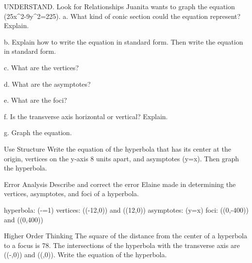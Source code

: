 \documentclass{article}
\newenvironment{practice}[2]{}{}        %
\newcommand{\answer}[1]{}               %
\newcommand{\placeholder}[2]{}          %
\newcommand{\te}[1]{}                   %
\begin{document}
\begin{practice}{13}{2}
UNDERSTAND. Look for Relationships Juanita wants to graph the equation (25x^2-9y^2=225).
a. What kind of conic section could the equation represent? Explain.
\answer{The coefficients (x^2) and (y^2) in the equation have opposite signs, so it could be a hyperbola.}
b. Explain how to write the equation in standard form. Then write the equation in standard form.
\answer{Divide each side of the equation by 225; (\frac{x^2}{9}-\frac{y^2}{25}=1)}
c. What are the vertices?
\answer{((-3,0)) and ((3,0))}
d. What are the asymptotes?
\answer{(y=\pm\frac{5}{3}x)}
e. What are the foci?
\answer{((-\sqrt{34},0)) and ((\sqrt{34},0))}
f. Is the transverse axis horizontal or vertical? Explain.
\answer{The transverse axis is horizontal because the vertices and foci lie along the x-axis.}
g. Graph the equation.
\answer{See graph.}
\placeholder{graph}{Answer 13g: unit grid [-5,5] both axes, black x/y axes with arrows, O origin, labels +/-2,+/-4. Red horizontal hyperbola x^2/9-y^2/25=1 with arrowheads at four ends and vertices (+/-3,0). No asymptotes.}
\end{practice}
\begin{practice}{14}{2}
Use Structure Write the equation of the hyperbola that has its center at the origin, vertices on the y-axis 8 units apart, and asymptotes (y=\pm{}x). Then graph the hyperbola.
\answer{(\frac{y^2}{16}-\frac{x^2}{9}=1)}
\placeholder{graph}{Answer 14: grid [-10,10] both axes with spacing 2, labels +/-4,+/-8, black x/y axes arrows and O origin. Red vertical hyperbola y^2/16-x^2/9=1 with vertices (0,+/-4) and arrowheads at four ends.}
\end{practice}
\begin{practice}{15}{2}
Error Analysis Describe and correct the error Elaine made in determining the vertices, asymptotes, and foci of a hyperbola.
\te{Student work marked with a red X:}
hyperbola: (-=1)
vertices: ((-12,0)) and ((12,0))
asymptotes: (y=\pm{}x)
foci: ((0,-400)) and ((0,400))
\answer{The equation shows that there is a vertical transverse axis, so the vertices are at ((0,-12)) and ((0,12)), not ((-12,0)) and ((12,0)). Also, because the transverse axis is vertical, the asymptotes are at (y=\pm\frac{3}{4}x), not (y=\pm\frac{4}{3}x). Finally, (c^2=144+256=400), so (c=20). This means the foci are at ((0,-20)) and ((0,20)), not ((0,-400)) and ((0,400)).}
\end{practice}
\begin{practice}{16}{2}
Higher Order Thinking The square of the distance from the center of a hyperbola to a focus is 78. The intersections of the hyperbola with the transverse axis are ((-,0)) and ((,0)). Write the equation of the hyperbola.
\answer{(\frac{x^2}{20}-\frac{y^2}{58}=1)}
\end{practice}
\end{document}

